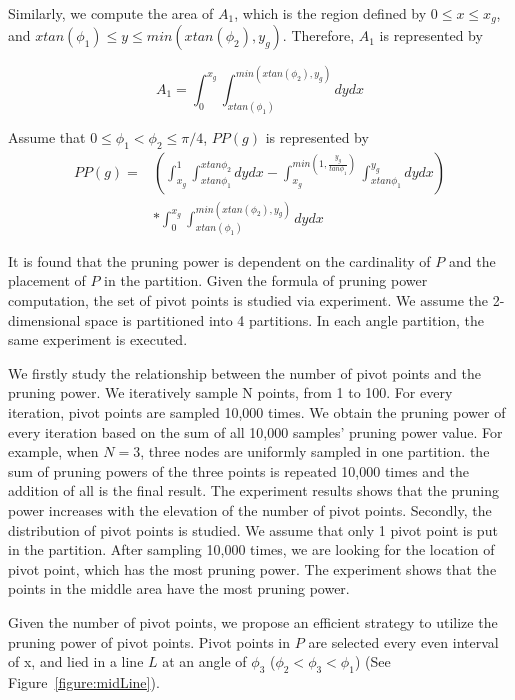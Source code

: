 Similarly, we compute the area of $A_1$, which is the region defined by $0 \le x \le x_g$, and $x tan(\phi_1) \le y \le min(x tan(\phi_2), y_g)$. Therefore, $A_1$ is represented by 

\begin{equation}
A_1 = \int_{0}^{x_g} \int_{x tan(\phi_1)}^{ min(x tan(\phi_2), y_g) } dydx
\end{equation}


Assume that $0 \leq \phi_1 < \phi_2 \leq \pi/4$, $PP(g)$ is represented by 
\begin{equation}
\begin{aligned}
PP(g) = & (\int_{x_g}^{1} \int_{x tan \phi_1}^{x tan \phi_2} dydx- \int_{x_g}^{min(1, \frac{y_g}{tan \phi_1})} \int_{x tan \phi_1}^{y_g} dydx)  \\
  & * \int_{0}^{x_g} \int_{x tan(\phi_1)}^{ min(x tan(\phi_2), y_g) } dydx
\end{aligned}
\end{equation}

It is found that the pruning power is dependent on the cardinality of $P$ and the placement of $P$ in the partition. Given the formula of pruning power computation, the set of pivot points is studied via experiment. We assume the 2-dimensional space is partitioned into 4 partitions. In each angle partition, the same experiment is executed.


We firstly study the relationship between the number of pivot points and the pruning power. We iteratively sample N points, from 1 to 100. For every iteration, pivot points are sampled 10,000 times. We obtain the pruning power of every iteration based on the sum of all 10,000 samples' pruning power value. For example, when $N=3$, three nodes are uniformly sampled in one partition. the sum of pruning powers of the three points is repeated 10,000 times and the addition of all is the final result. The experiment results shows that the pruning power increases with the elevation of the number of pivot points. Secondly, the distribution of pivot points is studied. We assume that only 1 pivot point is put in the partition. After sampling 10,000 times, we are looking for the location of pivot point, which has the most pruning power. The experiment shows that the points in the middle area have the most pruning power.  

Given the number of pivot points, we propose an efficient strategy to utilize the pruning power of pivot points. Pivot points in $P$ are selected every even interval of x, and lied in a line $L$ at an angle of $\phi_3$ ($ \phi_2 < \phi_3 < \phi_1 $) (See Figure~\ref{figure:midLine}).

